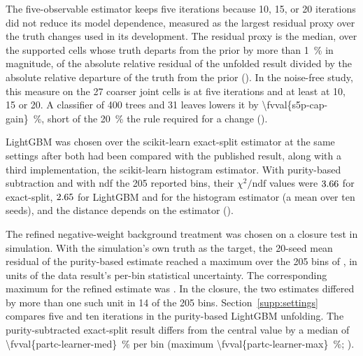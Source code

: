 The five-observable estimator keeps five iterations because 10, 15, or 20 iterations did not reduce its model dependence, measured as the largest residual proxy over the truth changes used in its development. The residual proxy is the median, over the supported cells whose truth departs from the prior by more than \SI{1}{\percent} in magnitude, of the absolute relative residual of the unfolded result divided by the absolute relative departure of the truth from the prior (). In the noise-free study, this measure on the 27 coarser joint cells is  at five iterations and at least  at 10, 15 or 20. A classifier of 400 trees and 31 leaves lowers it by \SI{\fvval{s5p-cap-gain}}{\percent}, short of the \SI{20}{\percent} the rule required for a change ().

LightGBM was chosen over the scikit-learn exact-split estimator at the same settings after both had been compared with the published result, along with a third implementation, the scikit-learn histogram estimator. With purity-based subtraction and with ndf the 205 reported bins, their $\chi^{2}/\mathrm{ndf}$ values were $3.66$ for exact-split, $2.65$ for LightGBM and  for the histogram estimator (a mean over ten seeds), and the distance depends on the estimator ().

The refined negative-weight background treatment was chosen on a closure test in simulation. With the simulation's own truth as the target, the 20-seed mean residual of the purity-based estimate reached a maximum over the 205 bins of , in units of the data result's per-bin statistical uncertainty. The corresponding maximum for the refined estimate was . In the closure, the two estimates differed by more than one such unit in 14 of the 205 bins.
Section~\ref{supp:settings} compares five and ten iterations in the purity-based LightGBM unfolding. The purity-subtracted exact-split result differs from the central value by a median of \SI{\fvval{partc-learner-med}}{\percent} per bin (maximum \SI{\fvval{partc-learner-max}}{\percent}; ).

